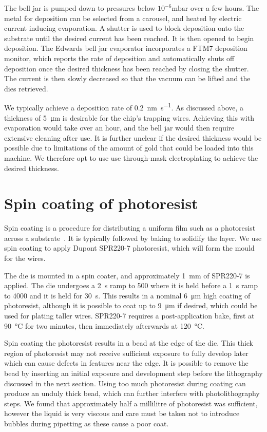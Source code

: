 The bell jar is pumped down to pressures below $10^{-6}\si{\milli\bar}$ over a
few hours. The metal for deposition can be selected from a carousel, and heated
by electric current inducing evaporation.  A shutter is used to block
deposition onto the substrate until the desired current has been reached. It is
then opened to begin deposition.
The Edwards bell jar evaporator incorporates a FTM7 deposition monitor, which
reports the rate of deposition and automatically shuts off deposition once the
desired thickness has been reached by closing the shutter. The current is then
slowly decreased so that the vacuum can be lifted and the dies retrieved.

We typically achieve a deposition rate of \SI{0.2}{\nano\meter\per\second}. As
discussed above, a thickness of \SI{5}{\micro\meter} is desirable for the
chip's trapping wires. Achieving this with evaporation would take over an hour,
and the bell jar would then require extensive cleaning after use. It is further
unclear if the desired thickness would be possible due to limitations of the
amount of gold that could be loaded into this machine. We therefore opt to use
use through-mask electroplating to achieve the desired thickness.

\section{Spin coating of photoresist}
\label{fab:spin}

Spin coating is a procedure for distributing a uniform film such as a
photoresist  across a substrate~\cite{Cohen2011}. It is typically followed by
baking to solidify the layer. We use spin coating to apply Dupont SPR220-7
photoresist, which will form the mould for the wires.

The die is mounted in a spin coater, and approximately \SI{1}{\milli\meter} of
SPR220-7 is applied. The die undergoes a \SI{2}{\second} ramp to \SI{500}{\rpm}
where it is held before a \SI{1}{\second} ramp to \SI{4000}{\rpm} and it is
held for \SI{30}{\second}. This results in a nominal \SI{6}{\micro\meter} high
coating of photoresist, although it is possible to coat up to
\SI{9}{\micro\meter} if desired, which could be used for plating taller wires.
SPR220-7 requires a post-application bake, first at \SI{90}{\celsius} for two
minutes, then immediately afterwards at \SI{120}{\celsius}.

Spin coating the photoresist results in a bead at the edge of the die. This
thick region of photoresist may not receive sufficient exposure to fully
develop later which can cause defects in features near the edge. It is possible
to remove the bead by inserting an initial exposure and development step before
the lithography discussed in the next section. Using too much photoresist
during coating can produce an unduly thick bead, which can further interfere
with photolithography steps. We found that approximately half a millilitre of
photoresist was sufficient, however the liquid is very viscous and care must be
taken not to introduce bubbles during pipetting as these cause a poor coat.

